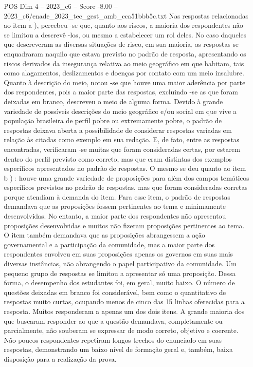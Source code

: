 \begin{textsample}{POS Dim 4 – 2023\_c6 – Score -8.00 – 2023\_c6/enade\_2023\_tec\_gest\_amb\_cca51bbb5c.txt}
Nas respostas relacionadas ao item a ), percebeu -se que, quanto aos riscos, a maioria dos respondentes não se limitou a descrevê -los, ou mesmo a estabelecer um rol deles.
No caso daqueles que descreveram as diversas situações de risco, em sua maioria, as respostas se enquadraram naquilo que estava previsto no padrão de resposta, apresentando os riscos derivados da insegurança relativa ao meio geográfico em que habitam, tais como alagamentos, deslizamentos e doenças por contato com um meio insalubre.
Quanto à descrição do meio, notou -se que houve uma maior aderência por parte dos respondentes, pois a maior parte das respostas, excluindo -se as que foram deixadas em branco, descreveu o meio de alguma forma.
Devido à grande variedade de possíveis descrições do meio geográfico e/ou social em que vive a população brasileira de perfil pobre ou extremamente pobre, o padrão de respostas deixava aberta a possibilidade de considerar respostas variadas em relação às citadas como exemplo em sua redação.
E, de fato, entre as respostas encontradas, verificaram -se muitas que foram consideradas certas, por estarem dentro do perfil previsto como correto, mas que eram distintas dos exemplos específicos apresentados no padrão de respostas.
O mesmo se deu quanto ao item b ) : houve uma grande variedade de proposições para além dos campos temáticos específicos previstos no padrão de respostas, mas que foram consideradas corretas porque atendiam à demanda do item.
Para esse item, o padrão de respostas demandava que as proposições fossem pertinentes ao tema e minimamente desenvolvidas.
No entanto, a maior parte dos respondentes não apresentou proposições desenvolvidas e muitos não fizeram proposições pertinentes ao tema.
O item também demandava que as proposições abrangessem a ação governamental e a participação da comunidade, mas a maior parte dos respondentes envolveu em suas proposições apenas os governos em suas mais diversas instâncias, não abrangendo o papel participativo da comunidade.
Um pequeno grupo de respostas se limitou a apresentar só uma proposição.
Dessa forma, o desempenho dos estudantes foi, em geral, muito baixo.
O número de questões deixadas em branco foi considerável, bem como o quantitativo de respostas muito curtas, ocupando menos de cinco das 15 linhas oferecidas para a resposta.
Muitos responderam a apenas um dos dois itens.
A grande maioria dos que buscaram responder ao que a questão demandava, completamente ou parcialmente, não souberam se expressar de modo correto, objetivo e coerente.
Não poucos respondentes repetiram longos trechos do enunciado em suas respostas, demonstrando um baixo nível de formação geral e, também, baixa disposição para a realização da prova.

\end{textsample}
